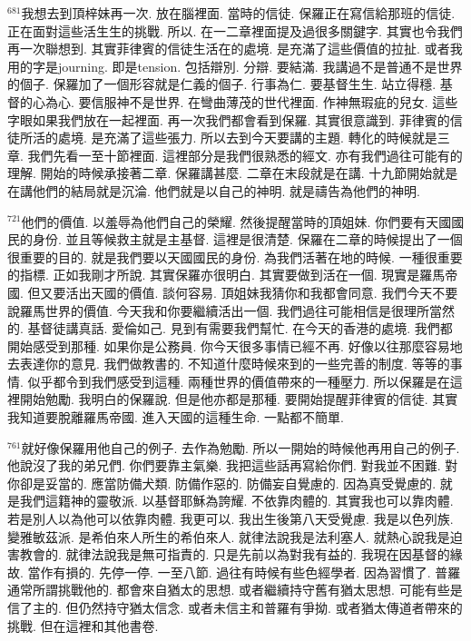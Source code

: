 \documentclass{book}
\begin{document}
$^{681}$我想去到頂梓妹再一次.
放在腦裡面.
當時的信徒.
保羅正在寫信給那班的信徒.
正在面對這些活生生的挑戰.
所以.
在一二章裡面提及過很多關鍵字.
其實也令我們再一次聯想到.
其實菲律賓的信徒生活在的處境.
是充滿了這些價值的拉扯.
或者我用的字是journing.
即是tension.
包括辯別.
分辯.
要結滿.
我講過不是普通不是世界的個子.
保羅加了一個形容就是仁義的個子.
行事為仁.
要基督生生.
站立得穩.
基督的心為心.
要信服神不是世界.
在彎曲薄茂的世代裡面.
作神無瑕疵的兒女.
這些字眼如果我們放在一起裡面.
再一次我們都會看到保羅.
其實很意識到.
菲律賓的信徒所活的處境.
是充滿了這些張力.
所以去到今天要講的主題.
轉化的時候就是三章.
我們先看一至十節裡面.
這裡部分是我們很熟悉的經文.
亦有我們過往可能有的理解.
開始的時候承接著二章.
保羅講甚麼.
二章在末段就是在講.
十九節開始就是在講他們的結局就是沉淪.
他們就是以自己的神明.
就是禱告為他們的神明.

$^{721}$他們的價值.
以羞辱為他們自己的榮耀.
然後提醒當時的頂姐妹.
你們要有天國國民的身份.
並且等候救主就是主基督.
這裡是很清楚.
保羅在二章的時候提出了一個很重要的目的.
就是我們要以天國國民的身份.
為我們活著在地的時候.
一種很重要的指標.
正如我剛才所說.
其實保羅亦很明白.
其實要做到活在一個.
現實是羅馬帝國.
但又要活出天國的價值.
談何容易.
頂姐妹我猜你和我都會同意.
我們今天不要說羅馬世界的價值.
今天我和你要繼續活出一個.
我們過往可能相信是很理所當然的.
基督徒講真話.
愛倫如己.
見到有需要我們幫忙.
在今天的香港的處境.
我們都開始感受到那種.
如果你是公務員.
你今天很多事情已經不再.
好像以往那麼容易地去表達你的意見.
我們做教書的.
不知道什麼時候來到的一些完善的制度.
等等的事情.
似乎都令到我們感受到這種.
兩種世界的價值帶來的一種壓力.
所以保羅是在這裡開始勉勵.
我明白的保羅說.
但是他亦都是那種.
要開始提醒菲律賓的信徒.
其實我知道要脫離羅馬帝國.
進入天國的這種生命.
一點都不簡單.

$^{761}$就好像保羅用他自己的例子.
去作為勉勵.
所以一開始的時候他再用自己的例子.
他說沒了我的弟兄們.
你們要靠主氣樂.
我把這些話再寫給你們.
對我並不困難.
對你卻是妥當的.
應當防備犬類.
防備作惡的.
防備妄自覺慮的.
因為真受覺慮的.
就是我們這籍神的靈敬派.
以基督耶穌為誇耀.
不依靠肉體的.
其實我也可以靠肉體.
若是別人以為他可以依靠肉體.
我更可以.
我出生後第八天受覺慮.
我是以色列族.
變雅敏茲派.
是希伯來人所生的希伯來人.
就律法說我是法利塞人.
就熱心說我是迫害教會的.
就律法說我是無可指責的.
只是先前以為對我有益的.
我現在因基督的緣故.
當作有損的.
先停一停.
一至八節.
過往有時候有些色經學者.
因為習慣了.
普羅通常所謂挑戰他的.
都會來自猶太的思想.
或者繼續持守舊有猶太思想.
可能有些是信了主的.
但仍然持守猶太信念.
或者未信主和普羅有爭拗.
或者猶太傳道者帶來的挑戰.
但在這裡和其他書卷.
\end{document}
